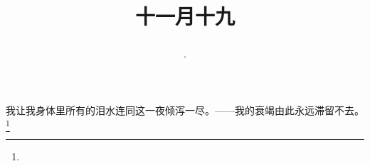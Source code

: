 \title{\date[d=19,m=12,y=2024][year:cn-y,年,month:cn,day:cn,日,·,weekday]·十一月十九 }
我让我身体里所有的泪水连同这一夜倾泻一尽。——我的衰竭由此永远滞留不去。\footnote{ }

